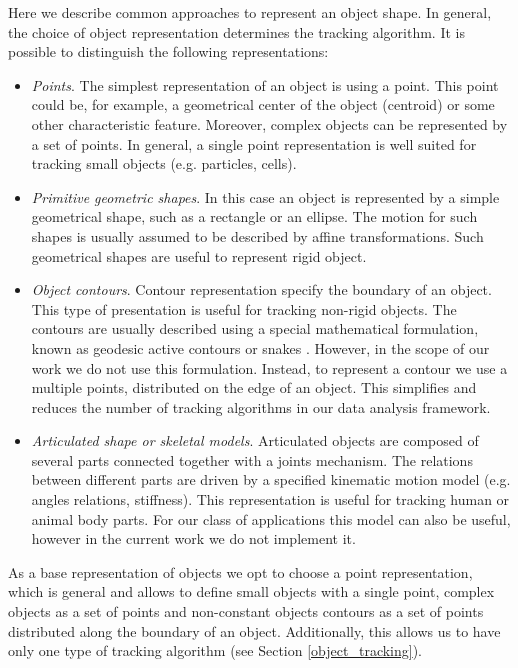 Here we describe common approaches to represent an object shape. In general, the choice of object representation determines the tracking algorithm. It is possible to distinguish the following representations:  
\begin{itemize}
   \item \textit{Points}. The simplest representation of an object is using a point. This point could be, for example, a geometrical center of the object (centroid) or some other characteristic feature. Moreover, complex objects can be represented by a set of points. In general,
a single point representation is well suited for tracking small objects (e.g. particles, cells).

  \item \textit{Primitive geometric shapes}. In this case an object is represented by a simple geometrical shape, such as a rectangle or an ellipse. The motion for such shapes is usually assumed to be described by affine transformations. Such geometrical shapes are useful to represent rigid object.
  
  \item \textit{Object contours}. Contour representation specify the boundary of an
object. This type of presentation is useful for tracking non-rigid objects. The contours are usually described using a special mathematical formulation, known as geodesic active contours or snakes \cite{Caselles95}. However, in the scope of our work we do not use this formulation. Instead, to represent a contour we use a multiple points, distributed on the edge of an object. This simplifies and reduces the number of tracking algorithms in our data analysis framework. 
    
\item \textit{Articulated shape or skeletal models}. Articulated objects are composed of several parts connected together with a joints mechanism. The relations between different parts are driven by a specified kinematic motion model (e.g. angles relations, stiffness). This representation is useful for tracking human or animal body parts. For our class of applications this model can also be useful, however in the current work we do not implement it.
\end{itemize}

As a base representation of objects we opt to choose a point representation, which is general and allows to define small objects with a single point, complex objects as a set of points and non-constant objects contours as a set of points distributed along the boundary of an object. Additionally, this allows us to have only one type of tracking algorithm (see Section \ref{object_tracking}).  


